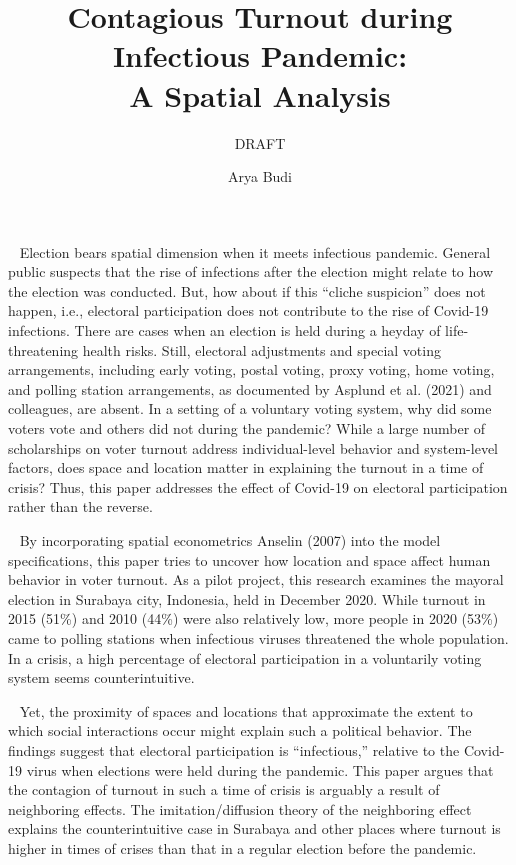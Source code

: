 \documentclass[
  12pt,
]{article}
\title{Contagious Turnout during Infectious Pandemic:\\
A Spatial Analysis}
\subtitle{DRAFT}
\author{Arya Budi}
\date{}
\begin{document}
\maketitle

~ Election bears spatial dimension when it meets infectious pandemic.
General public suspects that the rise of infections after the election
might relate to how the election was conducted. But, how about if this
``cliche suspicion'' does not happen, i.e., electoral participation does
not contribute to the rise of Covid-19 infections. There are cases when
an election is held during a heyday of life-threatening health risks.
Still, electoral adjustments and special voting arrangements, including
early voting, postal voting, proxy voting, home voting, and polling
station arrangements, as documented by Asplund et al. (2021) and
colleagues, are absent. In a setting of a voluntary voting system, why
did some voters vote and others did not during the pandemic? While a
large number of scholarships on voter turnout address individual-level
behavior and system-level factors, does space and location matter in
explaining the turnout in a time of crisis? Thus, this paper addresses
the effect of Covid-19 on electoral participation rather than the
reverse.

~ By incorporating spatial econometrics Anselin (2007) into the model
specifications, this paper tries to uncover how location and space
affect human behavior in voter turnout. As a pilot project, this
research examines the mayoral election in Surabaya city, Indonesia, held
in December 2020. While turnout in 2015 (51\%) and 2010 (44\%) were also
relatively low, more people in 2020 (53\%) came to polling stations when
infectious viruses threatened the whole population. In a crisis, a high
percentage of electoral participation in a voluntarily voting system
seems counterintuitive.

~ Yet, the proximity of spaces and locations that approximate the extent
to which social interactions occur might explain such a political
behavior. The findings suggest that electoral participation is
``infectious,'' relative to the Covid-19 virus when elections were held
during the pandemic. This paper argues that the contagion of turnout in
such a time of crisis is arguably a result of neighboring effects. The
imitation/diffusion theory of the neighboring effect explains the
counterintuitive case in Surabaya and other places where turnout is
higher in times of crises than that in a regular election before the
pandemic.
\end{document}

